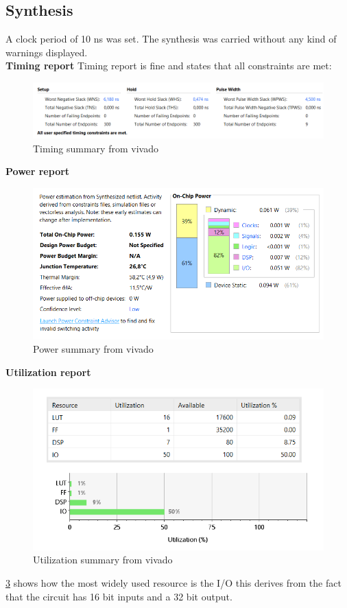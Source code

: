 \subsection{Synthesis}
A clock period of 10 ns was set. The synthesis was carried without any kind of warnings displayed.\\
\textbf{Timing report} Timing report is fine and states that all constraints are met:
\begin{figure}[H]
  \centering
  \includegraphics[width=0.9\linewidth]{./images/timing.PNG}
  \caption{Timing summary from vivado}
  \label{fig:timing}
\end{figure}
\textbf{Power report} 
\begin{figure}[H]
  \centering
  \includegraphics[width=0.9\linewidth]{./images/power.PNG}
  \caption{Power summary from vivado}
  \label{fig:power}
\end{figure}
\textbf{Utilization report}

\begin{figure}[H]
  \centering
  \includegraphics[width=0.9\linewidth]{./images/utilization.PNG}
  \caption{Utilization summary from vivado}
  \label{fig:utilization}
\end{figure}
\ref{fig:utilization} shows how the most widely used resource is the I/O this derives from the fact that the circuit has 16 bit inputs and a 32 bit output.
